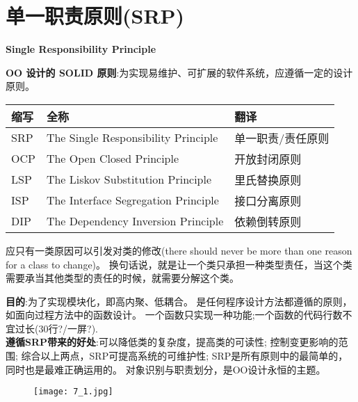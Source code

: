 \documentclass[../main.tex]{subfiles}
\begin{document}
\section{单一职责原则(SRP)}
\textbf{Single Responsibility Principle}

\textbf{OO 设计的 SOLID 原则}:为实现易维护、可扩展的软件系统，应遵循一定的设计原则。
\begin{table}[H]
  \begin{center}
    \begin{tabular}[c]{lll}
      \hline
      缩写 & 全称 & 翻译 \\
      \hline
      SRP & The Single Responsibility Principle & 单一职责/责任原则 \\
      OCP & The Open Closed Principle & 开放封闭原则 \\
      LSP & The Liskov Substitution Principle & 里氏替换原则 \\
      ISP & The Interface Segregation Principle & 接口分离原则 \\
      DIP & The Dependency Inversion Principle & 依赖倒转原则 \\
      \hline
    \end{tabular}
  \end{center}
\end{table}
\noindent 应只有一类原因可以引发对类的修改(there should never be more than one reason for a class to change)。
换句话说，就是让一个类只承担一种类型责任，当这个类需要承当其他类型的责任的时候，就需要分解这个类。

\noindent \textbf{目的}:为了实现模块化，即高内聚、低耦合。
是任何程序设计方法都遵循的原则，如面向过程方法中的函数设计。
一个函数只实现一种功能;一个函数的代码行数不宜过长(30行?/一屏?). \\
\noindent \textbf{遵循SRP带来的好处}:可以降低类的复杂度，提高类的可读性;
控制变更影响的范围;
综合以上两点，SRP可提高系统的可维护性;
SRP是所有原则中的最简单的，同时也是最难正确运用的。
对象识别与职责划分，是OO设计永恒的主题。
\begin{figure}[H]
  \begin{center}
    \texttt{[image: 7\_1.jpg]}
  \end{center}
\end{figure}
\end{document}

